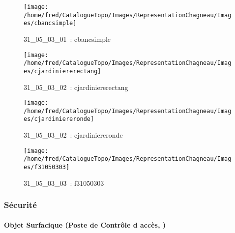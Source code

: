 \documentclass[12pt,titlepage]{book}
\begin{document}
\begin{figure}[h!]
\begin{minipage}[t]{3cm}
    \begin{center}
      \texttt{[image: /home/fred/CatalogueTopo/Images/RepresentationChagneau/Images/cbancsimple]}
      \caption[~31\_05\_03\_01]{\small{31\_05\_03\_01~:} \tiny{cbancsimple}}\label{cbancsimple}
    \end{center}
  \end{minipage}
  \begin{minipage}[t]{3cm}
    \begin{center}
      \texttt{[image: /home/fred/CatalogueTopo/Images/RepresentationChagneau/Images/cjardiniererectang]}
      \caption[~31\_05\_03\_02]{\small{31\_05\_03\_02~:} \tiny{cjardiniererectang}}\label{cjardiniererectang}
    \end{center}
  \end{minipage}
  \begin{minipage}[t]{3cm}
    \begin{center}
      \texttt{[image: /home/fred/CatalogueTopo/Images/RepresentationChagneau/Images/cjardiniereronde]}
      \caption[~31\_05\_03\_02]{\small{31\_05\_03\_02~:} \tiny{cjardiniereronde}}\label{cjardiniereronde}
    \end{center}
  \end{minipage}
  \begin{minipage}[t]{3cm}
    \begin{center}
      \texttt{[image: /home/fred/CatalogueTopo/Images/RepresentationChagneau/Images/f31050303]}
      \caption[~31\_05\_03\_03]{\small{31\_05\_03\_03~:} \tiny{f31050303}}\label{f31050303}
    \end{center}
  \end{minipage}
\end{figure}

\subsubsection{\large Sécurité}
\paragraph{Objet Surfacique (Poste de Contrôle d accès,  )}
\noindent
\vspace{\baselineskip}
\end{document}
